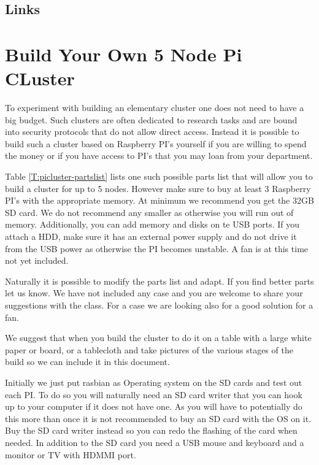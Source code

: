 \subsection{Links}\label{links}


\section{Build Your Own 5 Node Pi CLuster}

To experiment with building an elementary cluster one does not need to
have a big budget. Such clusters are often dedicated to research tasks
and are bound into security protocols that do not allow direct
access. Instead it is possible to build such a cluster based on
Raspberry PI's yourself if you are willing to spend the money or if
you have access to PI's that you may loan from your department.

Table \ref{T:picluster-partslist} lists one such possible parts list
that will allow you to build a cluster for up to 5 nodes. However make
sure to buy at least 3 Raspberry PI's with the appropriate memory. At
minimum we recommend you get the 32GB SD card. We do not recommend any
smaller as otherwise you will run out of memory. Additionally, you can
add memory and disks on te USB ports. If you attach a HDD, make sure
it has an external power supply and do not drive it from the USB power
as otherwise the PI becomes unstable.  A fan is at this time not yet
included.

Naturally it is possible to modify the parts list and adapt. If you
find better parts let us know. We have not included any case and you
are welcome to share your suggestions with the class. For a case we
are looking also for a good solution for a fan.

We suggest that when you build the cluster to do it on a table with a
large white paper or board, or a tablecloth and take pictures of the
various stages of the build so we can include it in this document.

Initially we just put rasbian as Operating system on the SD cards and
test out each PI. To do so you will naturally need an SD card writer
that you can hook up to your computer if it does not have one. As you
will have to potentially do this more than once it is not recommended
to buy an SD card with the OS on it. Buy the SD card writer instead so
you can redo the flashing of the card when needed. In addition to the
SD card you need a USB mouse and keyboard and a monitor or TV with
HDMMI port.

